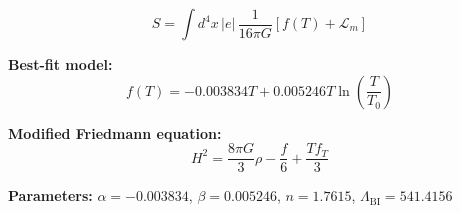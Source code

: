 
\begin{equation}
  S = \int d^4x \, |e| \, \frac{1}{16\pi G} \left[ f(T) + \mathcal{L}_m \right]
\end{equation}

\textbf{Best-fit model:}
\begin{equation}
  f(T) = -0.003834 T + 0.005246 T \ln\!\left(\frac{T}{T_0}\right)
\end{equation}

\textbf{Modified Friedmann equation:}
\begin{equation}
  H^2 = \frac{8\pi G}{3} \rho - \frac{f}{6} + \frac{T f_T}{3}
\end{equation}

\textbf{Parameters:}
$\alpha = -0.003834$, \quad
$\beta = 0.005246$, \quad
$n = 1.7615$, \quad
$\Lambda_{\text{BI}} = 541.4156$